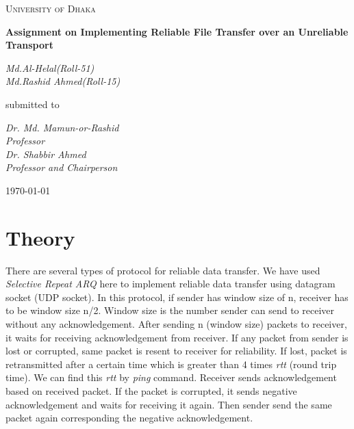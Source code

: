 \documentclass[12pt,a4paper]{report}
\begin{document}
\begin{titlepage}
\centering
{\scshape\LARGE University of Dhaka \par}
\vspace{1.5cm}
{\huge\bfseries Assignment on Implementing Reliable File Transfer over an Unreliable Transport\par}
\vspace{2cm}
{\Large\itshape Md.Al-Helal(Roll-51)\\Md.Rashid Ahmed(Roll-15)\par}
\vfill
submitted to\par
{\itshape Dr. Md. Mamun-or-Rashid \\ Professor \\Dr. Shabbir Ahmed \\Professor and Chairperson}
\vfill
{\large \today\par}
\end{titlepage}
\section*{Theory}
There are several types of protocol for reliable data transfer. We have used \textit{Selective Repeat ARQ} here to implement reliable data transfer using datagram socket (UDP socket). In this protocol, if sender has window size of n, receiver has to be window size n/2. Window size is the number sender can send to receiver without any acknowledgement. After sending n (window size) packets to receiver, it waits for receiving acknowledgement from receiver. If any packet from sender is lost or corrupted, same packet is resent to receiver for reliability. If lost, packet is retransmitted after a certain time which is greater than 4 times \textit{rtt} (round trip time). We can find this \textit{rtt} by \textit{ping} command. Receiver sends acknowledgement based on received packet. If the packet is corrupted, it sends negative acknowledgement and waits for receiving it again. Then sender send the same packet again corresponding the negative acknowledgement.
\end{document}
